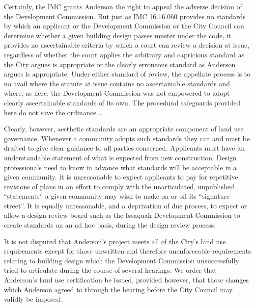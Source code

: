 Certainly, the IMC grants Anderson the right to appeal the adverse decision of
the Development Commission. But just as IMC 16.16.060 provides no standards by
which an applicant or the Development Commission or the City Council can
determine whether a given building design passes muster under the code, it
provides no ascertainable criteria by which a court can review a decision at
issue, regardless of whether the court applies the arbitrary and capricious
standard as the City argues is appropriate or the clearly erroneous standard as
Anderson argues is appropriate. Under either standard of review, the appellate
process is to no avail where the statute at issue contains no ascertainable
standards and where, as here, the Development Commission was not empowered to
adopt clearly ascertainable standards of its own. The procedural safeguards
provided here do not save the ordinance.\ldots

Clearly, however, aesthetic standards are an appropriate component of land use
governance. Whenever a community adopts such standards they can and must be
drafted to give clear guidance to all parties concerned. Applicants must have an
understandable statement of what is expected from new construction. Design
professionals need to know in advance what standards will be acceptable in a
given community. It is unreasonable to expect applicants to pay for repetitive
revisions of plans in an effort to comply with the unarticulated,
unpublished ``statements'' a given community may wish to make on or off
its ``signature street''. It is equally unreasonable, and a deprivation of due
process, to expect or allow a design review board such as the Issaquah
Development Commission to create standards on an ad hoc basis, during the design
review process.



It is not disputed that Anderson's project meets all of the City's land use
requirements except for those unwritten and therefore unenforceable requirements
relating to building design which the Development Commission unsuccessfully
tried to articulate during the course of several hearings. We order that
Anderson's land use certification be issued, provided however, that those
changes which Anderson agreed to through the hearing before the City Council may
validly be imposed.

